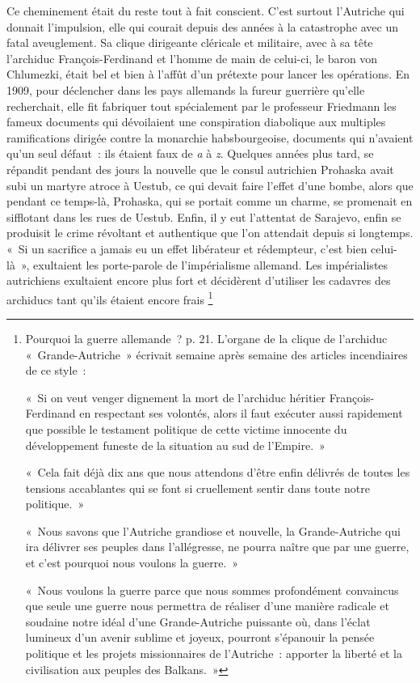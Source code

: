 \documentclass[french,twoside]{book} %
\begin{document}
Ce cheminement était du reste tout à fait conscient. C'est surtout l’Autriche qui donnait l’impulsion, elle qui courait depuis des années à la catastrophe avec un fatal aveuglement. Sa clique dirigeante cléricale et militaire, avec à sa tête l’archiduc François-Ferdinand et l’homme de main de celui-ci, le baron von Chlumezki, était bel et bien à l’affût d’un prétexte pour lancer les opérations. En 1909, pour déclencher dans les pays allemands la fureur guerrière qu’elle recherchait, elle fit fabriquer tout spécialement par le professeur Friedmann les fameux documents qui dévoilaient une conspiration diabolique aux multiples ramifications dirigée contre la monarchie habsbourgeoise, documents qui n’avaient qu’un seul défaut : ils étaient faux de \emph{a} à \emph{z}. Quelques années plus tard, se répandit pendant des jours la nouvelle que le consul autrichien Prohaska avait subi un martyre atroce à Uestub, ce qui devait faire l’effet d’une bombe, alors que pendant ce temps-là, Prohaska, qui se portait comme un charme, se promenait en sifflotant dans les rues de  Uestub. Enfin, il y eut l’attentat de Sarajevo, enfin se produisit le crime révoltant et authentique que l’on attendait depuis si longtemps. « Si un sacrifice a jamais eu un effet libérateur et rédempteur, c’est bien celui-là », exultaient les porte-parole de l’impérialisme allemand. Les impérialistes autrichiens exultaient encore plus fort et décidèrent d’utiliser les cadavres des archiducs tant qu’ils étaient encore frais \footnote{ \noindent Pourquoi la guerre allemande ? p. 21. L'organe de la clique de l’archiduc « Grande-Autriche » écrivait semaine après semaine des articles incendiaires de ce style :\par
 « Si on veut venger dignement la mort de l’archiduc héritier François-Ferdinand en respectant ses volontés, alors il faut exécuter aussi rapidement que possible le testament politique de cette victime innocente du développement funeste de la situation au sud de l’Empire. »\par
 « Cela fait déjà dix ans que nous attendons d’être enfin délivrés de toutes les tensions accablantes qui se font si cruellement sentir dans toute notre politique. »\par
 « Nous savons que l’Autriche grandiose et nouvelle, la Grande-Autriche qui ira délivrer ses peuples dans l’allégresse, ne pourra naître que par une guerre, et c’est pourquoi nous voulons la guerre. »\par
 « Nous voulons la guerre parce que nous sommes profondément convaincus que seule une guerre nous permettra de réaliser d’une manière radicale et soudaine notre idéal d’une Grande-Autriche puissante où, dans l’éclat lumineux d’un avenir sublime et joyeux, pourront s’épanouir la pensée politique et les projets missionnaires de l’Autriche : apporter la liberté et la civilisation aux peuples des Balkans. »\par
}
\end{document}
